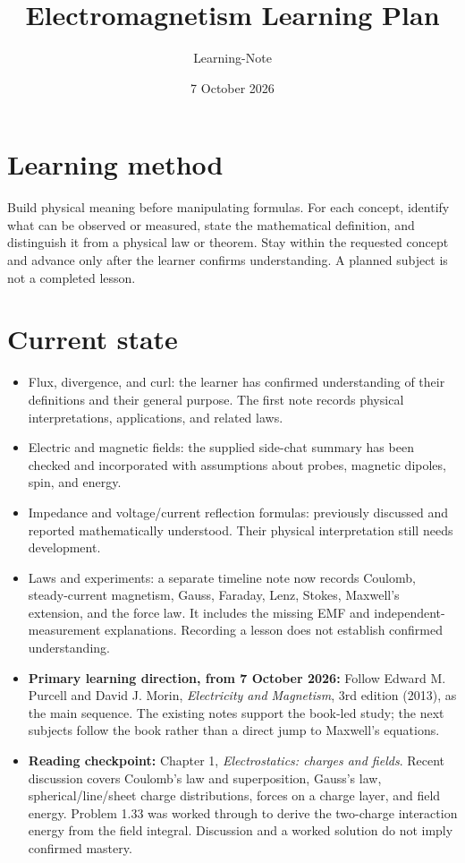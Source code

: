 \documentclass[11pt,letterpaper]{article}
\title{Electromagnetism Learning Plan}\author{Learning-Note}\date{7 October 2026}
\begin{document}
\maketitle
\section*{Learning method}
Build physical meaning before manipulating formulas. For each concept, identify what can be observed or measured, state the mathematical definition, and distinguish it from a physical law or theorem. Stay within the requested concept and advance only after the learner confirms understanding. A planned subject is not a completed lesson.

\section*{Current state}
\begin{itemize}
\item Flux, divergence, and curl: the learner has confirmed understanding of their definitions and their general purpose. The first note records physical interpretations, applications, and related laws.
\item Electric and magnetic fields: the supplied side-chat summary has been checked and incorporated with assumptions about probes, magnetic dipoles, spin, and energy.
\item Impedance and voltage/current reflection formulas: previously discussed and reported mathematically understood. Their physical interpretation still needs development.
\item Laws and experiments: a separate timeline note now records Coulomb, steady-current magnetism, Gauss, Faraday, Lenz, Stokes, Maxwell's extension, and the force law. It includes the missing EMF and independent-measurement explanations. Recording a lesson does not establish confirmed understanding.
\item \textbf{Primary learning direction, from 7 October 2026:} Follow Edward M. Purcell and David J. Morin, \emph{Electricity and Magnetism}, 3rd edition (2013), as the main sequence. The existing notes support the book-led study; the next subjects follow the book rather than a direct jump to Maxwell's equations.
\item \textbf{Reading checkpoint:} Chapter 1, \emph{Electrostatics: charges and fields}. Recent discussion covers Coulomb's law and superposition, Gauss's law, spherical/line/sheet charge distributions, forces on a charge layer, and field energy. Problem 1.33 was worked through to derive the two-charge interaction energy from the field integral. Discussion and a worked solution do not imply confirmed mastery.
\end{itemize}
\end{document}
